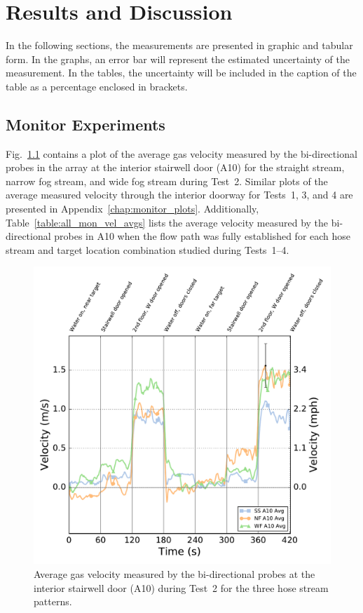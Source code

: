 \documentclass[12pt,oneside]{book}
\begin{document}
\chapter{Results and Discussion}
\label{chap:results}
In the following sections, the measurements are presented in graphic and tabular form. In the graphs, an error bar will represent the estimated uncertainty of the measurement. In the tables, the uncertainty will be included in the caption of the table as a percentage enclosed in brackets.

\section{Monitor Experiments}
\label{sec:monitor_results}
Fig.~\ref{fig:Test_2_BDP_A10_Avg_All} contains a plot of the average gas velocity measured by the bi-directional probes in the array at the interior stairwell door (A10) for the straight stream, narrow fog stream, and wide fog stream during Test~2. Similar plots of the average measured velocity through the interior doorway for Tests~1, 3, and 4 are presented in Appendix~\ref{chap:monitor_plots}. Additionally, Table~\ref{table:all_mon_vel_avgs} lists the average velocity measured by the bi-directional probes in A10 when the flow path was fully established for each hose stream and target location combination studied during Tests~1--4.

\begin{figure}[!ht]
	\includegraphics[width=\columnwidth]{../Figures/Plots/Test_16_West_063014_BDP_A10_stream_avgs}
	\caption[Average gas velocity through the interior stairwell door during Test~2 for the three hose stream patterns.]{Average gas velocity measured by the bi-directional probes at the interior stairwell door (A10) during Test~2 for the three hose stream patterns.}
	\label{fig:Test_2_BDP_A10_Avg_All}
\end{figure}
\end{document}
